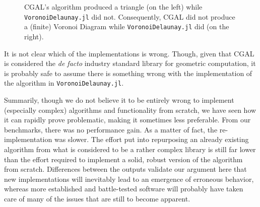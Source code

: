 \begin{figure}[htb]
  \resizebox{\linewidth}{!}{}
  \caption[Surprising Voronoi Delaunay output]{
    \ac{CGAL}'s algorithm produced a triangle (on the left) while
    \texttt{VoronoiDelaunay.jl} did not.  Consequently, \ac{CGAL} did not
    produce a (finite) Voronoi Diagram while \texttt{VoronoiDelaunay.jl} did (on
    the right).}%
  \label{fig:eval.voronoi.surprising}
\end{figure}

It is not clear which of the implementations is wrong.  Though, given that
\ac{CGAL} is considered the \textit{de facto} industry standard library for
geometric computation, it is probably safe to assume there is something wrong
with the implementation of the algorithm in \texttt{VoronoiDelaunay.jl}.

Summarily, though we do not believe it to be entirely wrong to implement
(especially complex) algorithms and functionality from scratch, we have seen how
it can rapidly prove problematic, making it sometimes less preferable.  From our
benchmarks, there was no performance gain.  As a matter of fact, the
re-implementation was slower.  The effort put into repurposing an already
existing algorithm from what is considered to be a rather complex library is
still far lower than the effort required to implement a solid, robust version of
the algorithm from scratch.  Differences between the outputs validate our
argument here that new implementations will inevitably lead to an emergence of
erroneous behavior, whereas more established and battle-tested software will
probably have taken care of many of the issues that are still to become
apparent.
